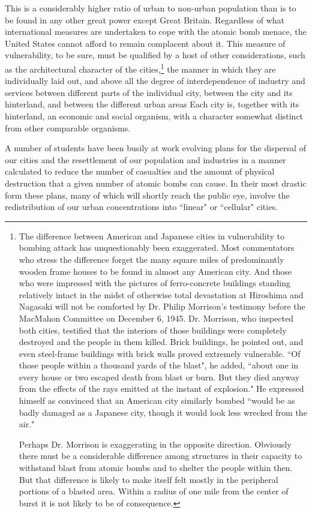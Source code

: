 This is a considerably higher ratio of urban to non-urban population than is to be found in any other great power except Great Britain. Regardless of what international measures are undertaken to cope with the atomic bomb menace, the United States cannot afford to remain complacent about it. This measure of vulnerability, to be sure, must be qualified by a host of other considerations, such as the architectural character of the cities,\footnote{The difference between American and Japanese cities in vulnerability to bombing attack has unquestionably been exaggerated. Most commentators who stress the difference forget the many square miles of predominantly wooden frame houses to be found in almost any American city. And those who were impressed with the pictures of ferro-concrete buildings standing relatively intact in the midst of otherwise total devastation at Hiroshima and Nagasaki will not be comforted by Dr. Philip Morrison's testimony before the MacMahon Committee on December 6, 1945. Dr. Morrison, who inspected both cities, testified that the interiors of those buildings were completely destroyed and the people in them killed. Brick buildings, he pointed out, and even steel-frame buildings with brick walls proved extremely vulnerable. ``Of those people within a thousand yards of the blast", he added, ``about one in every house or two escaped death from blast or burn. But they died anyway from the effects of the rays emitted at the instant of explosion." He expressed himself as convinced that an American city similarly bombed ``would be as badly damaged as a Japanese city, though it would look less wrecked from the air."

Perhaps Dr. Morrison is exaggerating in the opposite direction. Obviously there must be a considerable difference among structures in their capacity to withstand blast from atomic bombs and to shelter the people within then. But that difference is likely to make itself felt mostly in the peripheral portions of a blasted area. Within a radius of one mile from the center of burst it is not likely to be of consequence.} the manner in which they are individually laid out, and above all the degree of interdependence of industry and services between different parts of the individual city, between the city and its hinterland, and between the different urban areas Each city is, together with its hinterland, an economic and social organism, with a character somewhat distinct from other comparable organisms.

A number of students have been busily at work evolving plans for the dispersal of our cities and the resettlement of our population and industries in a manner calculated to reduce the number of casualties and the amount of physical destruction that a given number of atomic bombs can cause. In their most drastic form these plans, many of which will shortly reach the public eye, involve the redistribution of our urban concentrations into ``linear" or ``cellular" cities.

